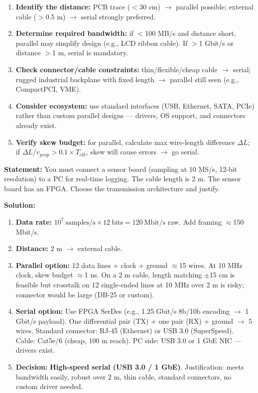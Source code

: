 \documentclass[11pt]{article}
\begin{document}
\begin{methode}
\begin{enumerate}
\item \textbf{Identify the distance:} PCB trace ($<$30 cm) $\rightarrow$ parallel possible; external cable ($>$0.5 m) $\rightarrow$ serial strongly preferred.
\item \textbf{Determine required bandwidth:} if $<$100 MB/s and distance short, parallel may simplify design (e.g., LCD ribbon cable). If $>$1 Gbit/s or distance $>$1 m, serial is mandatory.
\item \textbf{Check connector/cable constraints:} thin/flexible/cheap cable $\rightarrow$ serial; rugged industrial backplane with fixed length $\rightarrow$ parallel still seen (e.g., CompactPCI, VME).
\item \textbf{Consider ecosystem:} use standard interfaces (USB, Ethernet, SATA, PCIe) rather than custom parallel designs — drivers, OS support, and connectors already exist.
\item \textbf{Verify skew budget:} for parallel, calculate max wire-length difference $\Delta L$; if $\Delta L / v_{prop} > 0.1 \times T_{clk}$, skew will cause errors $\rightarrow$ go serial.
\end{enumerate}
\end{methode}

\begin{exoresolu}
\textbf{Statement:} You must connect a sensor board (sampling at 10 MS/s, 12-bit resolution) to a PC for real-time logging. The cable length is 2 m. The sensor board has an FPGA. Choose the transmission architecture and justify.

\textbf{Solution:}
\begin{enumerate}
\item \textbf{Data rate:} $10^7\ \text{samples/s} \times 12\ \text{bits} = 120\ \text{Mbit/s}$ raw. Add framing $\approx$150 Mbit/s.
\item \textbf{Distance:} 2 m $\rightarrow$ external cable.
\item \textbf{Parallel option:} 12 data lines + clock + ground $\approx$15 wires. At 10 MHz clock, skew budget $\approx$1 ns. On a 2 m cable, length matching $\pm$15 cm is feasible but crosstalk on 12 single-ended lines at 10 MHz over 2 m is risky; connector would be large (DB-25 or custom).
\item \textbf{Serial option:} Use FPGA SerDes (e.g., 1.25 Gbit/s 8b/10b encoding $\rightarrow$ 1 Gbit/s payload). One differential pair (TX) + one pair (RX) + ground $\rightarrow$ 5 wires. Standard connector: RJ-45 (Ethernet) or USB 3.0 (SuperSpeed). Cable: Cat5e/6 (cheap, 100 m reach). PC side: USB 3.0 or 1 GbE NIC — drivers exist.
\item \textbf{Decision:} \textbf{High-speed serial (USB 3.0 / 1 GbE)}. Justification: meets bandwidth easily, robust over 2 m, thin cable, standard connectors, no custom driver needed.
\end{enumerate}
\end{exoresolu}
\end{document}
